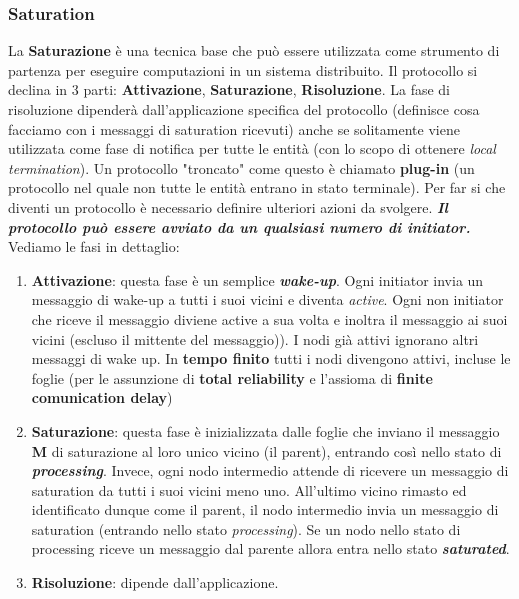\documentclass[12pt]{article}
\begin{document}
	\subsubsection{Saturation}  
		La \textbf{Saturazione} è una tecnica base che può essere utilizzata come strumento di partenza per eseguire computazioni in un sistema distribuito. Il protocollo si declina in 3 parti: \textbf{Attivazione}, \textbf{Saturazione}, \textbf{Risoluzione}.
		La fase di risoluzione dipenderà dall'applicazione specifica del protocollo (definisce cosa facciamo con i messaggi di saturation ricevuti) anche se solitamente viene utilizzata come fase di notifica per tutte le entità (con lo scopo di ottenere \textit{local termination}). Un protocollo "troncato" come questo è chiamato \textbf{plug-in} (un protocollo nel quale non tutte le entità entrano in stato terminale). Per far si che diventi un protocollo è necessario definire ulteriori azioni da svolgere. \textit{\textbf{Il protocollo può essere avviato da un qualsiasi numero di initiator.}} Vediamo le fasi in dettaglio:
		\begin{enumerate}
			\item \textbf{Attivazione}: questa fase è un semplice \textbf{\textit{wake-up}}. Ogni initiator invia un messaggio di wake-up a tutti i suoi vicini e diventa \textit{active}. Ogni non initiator che riceve il messaggio diviene active a sua volta e inoltra il messaggio ai suoi vicini (escluso il mittente del messaggio)). I nodi già attivi ignorano altri messaggi di wake up. In \textbf{tempo finito} tutti i nodi divengono attivi, incluse le foglie (per le assunzione di \textbf{total reliability} e l'assioma di \textbf{finite comunication delay})
			\item \textbf{Saturazione}: questa fase è inizializzata dalle foglie che inviano il messaggio \textbf{M} di saturazione al loro unico vicino (il parent), entrando così nello stato di \textbf{\textit{processing}}. Invece, ogni nodo intermedio attende di ricevere un messaggio di saturation da tutti i suoi vicini meno uno. All'ultimo vicino rimasto ed identificato dunque come il parent, il nodo intermedio invia un messaggio di saturation (entrando nello stato \textit{processing}). Se un nodo nello stato di processing riceve un messaggio dal parente allora entra nello stato \textit{\textbf{saturated}}.
			\item \textbf{Risoluzione}: dipende dall'applicazione.	
		\end{enumerate}	
		
\end{document}
